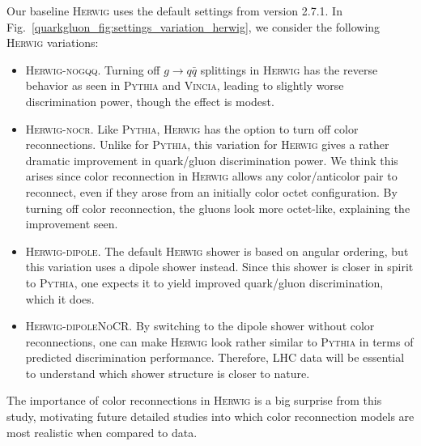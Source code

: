 \documentclass[11pt]{cernrep}
\begin{document}
Our baseline \textsc{Herwig} uses the default settings from version 2.7.1.  In Fig.~\ref{quarkgluon_fig:settings_variation_herwig}, we consider the following  \textsc{Herwig} variations:
\begin{itemize}
\item \textsc{Herwig-nogqq}.  Turning off $g \to q \bar{q}$ splittings in \textsc{Herwig} has the reverse behavior as seen in \textsc{Pythia} and \textsc{Vincia}, leading to slightly worse discrimination power, though the effect is modest.
\item \textsc{Herwig-nocr}.  Like \textsc{Pythia}, \textsc{Herwig} has the option to turn off color reconnections.  Unlike for \textsc{Pythia}, this variation for \textsc{Herwig} gives a rather dramatic improvement in quark/gluon discrimination power.  We think this arises since color reconnection in \textsc{Herwig} allows any color/anticolor pair to reconnect, even if they arose from an initially color octet configuration.  By turning off color reconnection, the gluons look more octet-like, explaining the improvement seen.
\item \textsc{Herwig-dipole}.  The default \textsc{Herwig} shower is based on angular ordering, but this variation uses a dipole shower instead.  Since this shower is closer in spirit to \textsc{Pythia}, one expects it to yield improved quark/gluon discrimination, which it does.
\item \textsc{Herwig-dipoleNoCR}.  By switching to the dipole shower without color reconnections, one can make \textsc{Herwig} look rather similar to \textsc{Pythia} in terms of predicted discrimination performance.  Therefore, LHC data will be essential to understand which shower structure is closer to nature.
\end{itemize}
The importance of color reconnections in \textsc{Herwig} is a big surprise from this study, motivating future detailed studies into which color reconnection models are most realistic when compared to data.
\end{document}
